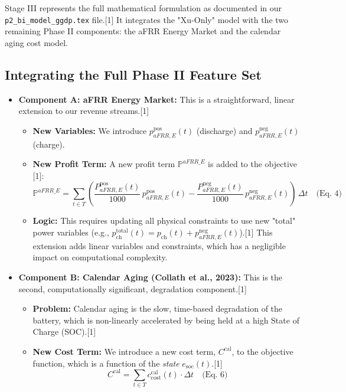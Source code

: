 \documentclass[11pt, a4paper]{article}
\begin{document}
Stage III represents the full mathematical formulation as documented in our \texttt{p2\_bi\_model\_ggdp.tex} file.[1] It integrates the "Xu-Only" model with the two remaining Phase II components: the aFRR Energy Market and the calendar aging cost model.

\subsection{Integrating the Full Phase II Feature Set}

\begin{itemize}
    \item \textbf{Component A: aFRR Energy Market:} This is a straightforward, linear extension to our revenue streams.[1]
    \begin{itemize}
        \item \textbf{New Variables:} We introduce $p^{\mathrm{pos}}_{aFRR,E}(t)$ (discharge) and $p^{\mathrm{neg}}_{aFRR,E}(t)$ (charge).
        \item \textbf{New Profit Term:} A new profit term $\mathbb{P}^{aFRR\_E}$ is added to the objective [1]:
        \begin{equation*}
            \mathbb{P}^{aFRR\_E} = \sum_{t\in T} \left( \frac{P^{\mathrm{pos}}_{aFRR, E}(t)}{1000}\, p^{\mathrm{pos}}_{aFRR, E}(t) - \frac{P^{\mathrm{neg}}_{aFRR, E}(t)}{1000}\, p^{\mathrm{neg}}_{aFRR, E}(t) \right)\, \Delta t \quad \text{(Eq. 4)}
        \end{equation*}
        \item \textbf{Logic:} This requires updating all physical constraints to use new "total" power variables (e.g., $p^{\mathrm{total}}_{\mathrm{ch}}(t) = p_{\mathrm{ch}}(t) + p^{\mathrm{neg}}_{aFRR,E}(t)$).[1] This extension adds linear variables and constraints, which has a negligible impact on computational complexity.
    \end{itemize}
    
    \item \textbf{Component B: Calendar Aging (Collath et al., 2023):} This is the second, computationally significant, degradation component.[1]
    \begin{itemize}
        \item \textbf{Problem:} Calendar aging is the slow, time-based degradation of the battery, which is non-linearly accelerated by being held at a high State of Charge (SOC).[1]
        \item \textbf{New Cost Term:} We introduce a new cost term, $C^{\mathrm{cal}}$, to the objective function, which is a function of the \textit{state} $e_{\mathrm{soc}}(t)$.[1]
        \begin{equation*}
            C^{\mathrm{cal}} = \sum_{t \in T} c^{\mathrm{cal}}_{\mathrm{cost}}(t) \cdot \Delta t \quad \text{(Eq. 6)}
        \end{equation*}
    \end{itemize}
\end{itemize}
\end{document}
